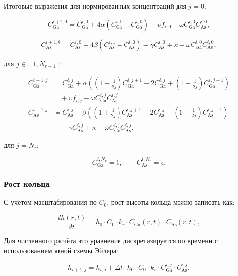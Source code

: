 \documentclass[14pt,oneside]{extarticle}
\begin{document}
Итоговые выражения для нормированных концентраций для $j=0$:

\[
C_{\text{Ga}}^{i+1,0} = C_{\text{Ga}}^{i,0}
+ 4 \alpha (C_{\text{Ga}}^{i,1} - C_{\text{Ga}}^{i,0})
+ \upsilon f_{i,0}
- \omega C_{\text{Ga}}^{i,0} C_{\text{As}}^{i,0},
\]

\[
C_{\text{As}}^{i+1,0} = C_{\text{As}}^{i,0}
+ 4 \beta (C_{\text{As}}^{i,1} - C_{\text{As}}^{i,0})
- \gamma C_{\text{As}}^{i,0}
+ \kappa
- \omega C_{\text{Ga}}^{i,0} C_{\text{As}}^{i,0},
\]

для $j\in\left[1,N_{r-1}\right]$:

\begin{align}
    C_{\text{Ga}}^{i+1,j} &= C_{\text{Ga}}^{i,j}
    + \alpha \left( \left(1+\frac{1}{2j}\right) C_{\text{Ga}}^{i,j+1}
    - 2 C_{\text{Ga}}^{i,j}
    + \left(1-\frac{1}{2j}\right) C_{\text{Ga}}^{i,j-1} \right) \nonumber \\
    &\quad + \upsilon f_{i,j}
    - \omega C_{\text{Ga}}^{i,j} C_{\text{As}}^{i,j}, \nonumber \\
    C_{\text{As}}^{i+1,j} &= C_{\text{As}}^{i,j}
    + \beta \left( \left(1+\frac{1}{2j}\right) C_{\text{As}}^{i,j+1}
    - 2 C_{\text{As}}^{i,j}
    + \left(1-\frac{1}{2j}\right) C_{\text{As}}^{i,j-1} \right) \nonumber \\
    &\quad - \gamma C_{\text{As}}^{i,j}
    + \kappa
    - \omega C_{\text{Ga}}^{i,j} C_{\text{As}}^{i,j}.
\end{align}    

для $j=N_{r}$:

\[
C_{\text{Ga}}^{i,N_r} = 0, \qquad C_{\text{As}}^{i,N_r} = \epsilon.
\]

\subsubsection{Рост кольца}

С учётом масштабирования по \( C_0 \), рост высоты кольца можно записать как:

\begin{equation}
\frac{d h(r,t)}{d t} = h_0 \cdot C_0 \cdot k_r \cdot C_{\text{Ga}}(r,t) \cdot C_{\text{As}}(r,t),
\end{equation}

Для численного расчёта это уравнение дискретизируется по времени с использованием явной схемы Эйлера:

\begin{equation}
h_{i+1,j} = h_{i,j} + \Delta t \cdot h_0 \cdot C_0 \cdot k_r \cdot C_{\text{Ga}}^{i,j} \cdot C_{\text{As}}^{i,j}.
\end{equation}
\end{document}

